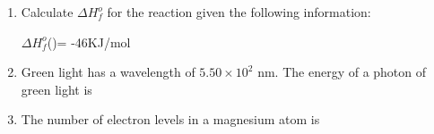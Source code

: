 \documentclass[main.tex]{subfiles}
\begin{document}
\begin{fullwidth}
\begin{multicols*}{2}
\begin{enumerate}
\item Calculate $\Delta H^o_f$ for the reaction given the following information:
	\begin{center}\end{center}	
$\Delta H^o_f$()= -46KJ/mol
\begin{enumerate}[label=(\alph*)]\vspace{-0.5cm}
\end{enumerate}\vspace{-0.5cm}





\item Green light has a wavelength of $5.50\times 10^2$ nm.  The energy of a photon of green light is
\begin{enumerate}[label=(\alph*)]\vspace{-0.5cm}
\end{enumerate}\vspace{-0.5cm}


\item The number of electron levels in a magnesium atom is
\begin{enumerate}[label=(\alph*)]\vspace{-0.5cm}
\end{enumerate}\vspace{-0.5cm}



\end{enumerate}
\end{multicols*}
\end{fullwidth}
\end{document}
